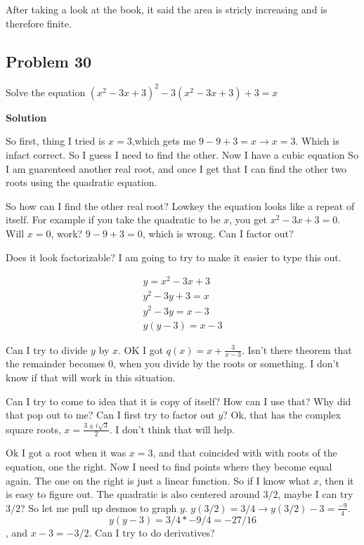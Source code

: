 \documentclass[12pt,tikz,border=10pt]{article}
\theoremstyle{definition}
\theoremstyle{remark}
\begin{document}
After taking a look at the book, it said the area is stricly increasing and is therefore finite.

\subsection{Problem 30}
Solve the equation 
$(x^2 - 3x + 3)^2 - 3(x^2 - 3x + 3) + 3=x$

\textbf{Solution}

So first, thing I tried is $x=3$,which gets me 
$9-9+3=x \rightarrow x=3$. Which is infact correct. So I guess I need 
to find the other. Now I have a cubic equation So I am guarenteed another real root,
and once I get that I can find the other two roots using the quadratic equation. 

So how can I find the other real root?
Lowkey the equation looks like a repeat of itself.
For example if you take the quadratic to be $x$, you get $x^2-3x+3=0$.
Will $x=0$, work? $9-9+3=0$, which is wrong. Can I factor out?

Does it look factorizable? I am going to try to make it easier to type this out.

\begin{align*}
    y=x^2 - 3x+3\\
    y^2-3y+3=x\\
    y^2-3y=x-3\\
    y(y-3)=x-3
\end{align*}

Can I try to divide $y$ by $x$. OK I got $q(x)=x+\frac{3}{x-3}$. Isn't there 
theorem that the remainder becomes 0, when you divide by the roots or something. I 
don't know if that will work in this situation.

Can I try to come to idea that it is copy of itself? How can I use that?
Why did that pop out to me? Can I first try to factor out $y$? Ok,
that has the complex square roots, $x=\frac{3 \pm i\sqrt{3}}{2}$. I don't think that will help.

Ok I got a root when it was $x=3$, and that coincided with with roots of the equation, one the right.
Now I need to find points where they become equal again. The one on the right is just a linear function.
So if I know what $x$, then it is easy to figure out. The quadratic is also centered around $3/2$, maybe I can try 
$3/2$? So let me pull up desmos to graph $y$. $y(3/2)=3/4 \rightarrow y(3/2)-3=\frac{-9}{4}$.
$$y(y-3) = 3/4 * -9/ 4 = -27/16$$, and $x-3=-3/2$. Can I try to do derivatives? 
\end{document}
